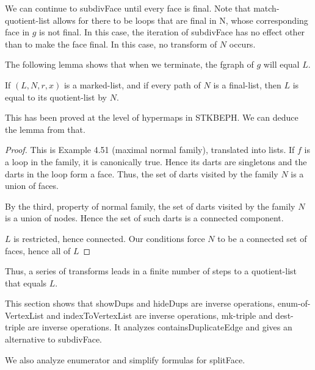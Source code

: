 We can continue to subdivFace until every face is final.  Note that match-quotient-list
allows for there to be loops that are final in N, whose corresponding face in $g$ is not final.
In this case, the iteration of subdivFace has no effect other than to make the face final.
In this case,  no transform of $N$ occurs.

The following lemma shows that when we terminate, the fgraph of $g$
will equal $L$.

\begin{lemma} If $(L,N,r,x)$ is a marked-list, 
and if every path of $N$
is a final-list, then $L$ is equal to its quotient-list by $N$.
\end{lemma}

This has been proved at the level of hypermaps in STKBEPH.  We can deduce
the lemma from that.

\begin{proof} This is Example 4.51 (maximal normal family), translated into lists.
If $f$ is a loop in the family, it is canonically true.  Hence its
darts are singletons and the darts in the loop form a face.  Thus,
the set of darts visited by the family $N$ is a union of faces.

By the third, property of normal family, the set of darts visited by
the family $N$ is a union of nodes.  Hence the set of such darts is
a connected component. 

$L$ is restricted, hence connected.  
Our conditions force $N$ to be a connected set of faces, hence all of $L$
\end{proof}


Thus, a series of transforms leads in a finite number of steps to a quotient-list that equals $L$.


This section shows that showDups and hideDups are inverse operations, enum-of-VertexList and indexToVertexList are inverse
operations, mk-triple and dest-triple are inverse operations.  It analyzes containsDuplicateEdge and gives
an alternative to subdivFace.

We also analyze enumerator and simplify formulas for splitFace.




